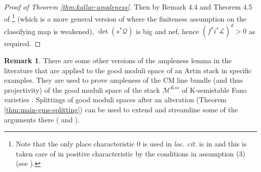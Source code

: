 \documentclass{amsart}
\theoremstyle{definition}
\newtheorem{remark}[remark]{Remark}
\newcommand{\cL}{\mathcal{L}}
\newcommand{\cM}{\mathcal{M}}
\newcommand{\cQ}{\mathcal{Q}}
\begin{document}
\begin{proof}[{Proof of Theorem \ref{thm:kollar-ampleness}}]
		Then by Remark 4.4 and Theorem 4.5 of \cite{KovacsPatakfalvi2017}\footnote{Note that the only place characteristic $0$ is used in \emph{loc. cit.} is in \cite[Proposition 4.7]{KovacsPatakfalvi2017} and this is taken care of in positive characteristic by the conditions in assumption (3) (see \cite[Remark 4.8]{KovacsPatakfalvi2017}).} (which is a more general version of \cite[Lemma 3.9]{KollarAmpleness} where the finiteness assumption on the classifying map is weakened), $\det(s^*\cQ)$ is big and nef, hence $(f^*i^*\cL)^d>0$ as required.
	\end{proof}
	
	\begin{remark}
		There are some other versions of the ampleness lemma in the literature that are applied to the good moduli space of an Artin stack in specific examples. They are used to prove ampleness of the CM line bundle (and thus projectivity) of the good moduli space of the stack $\cM^{Kss}$ of K-semistable Fano varieties \cite{codognipatakfalvi, posva, xuzhuang}. Splittings of good moduli spaces after an alteration (Theorem \ref{thm:main-gms-splitting}) can be used to extend and streamline some of the arguments there (\cite[Section 10]{codognipatakfalvi} and \cite[Section 7.1]{xuzhuang}). 
	\end{remark}
	
	
	
	
	
	
	
	
\end{document}
